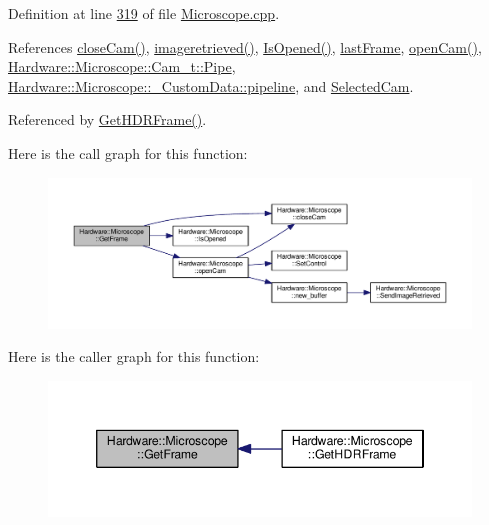 Definition at line \hyperlink{_microscope_8cpp_source_l00319}{319} of file \hyperlink{_microscope_8cpp_source}{Microscope.\+cpp}.



References \hyperlink{_microscope_8cpp_source_l00311}{close\+Cam()}, \hyperlink{class_hardware_1_1_microscope_a9ffc9b16e733b23c97d7dca4ef3210f5}{imageretrieved()}, \hyperlink{_microscope_8cpp_source_l00165}{Is\+Opened()}, \hyperlink{_microscope_8h_source_l00175}{last\+Frame}, \hyperlink{_microscope_8cpp_source_l00167}{open\+Cam()}, \hyperlink{_microscope_8h_source_l00130}{Hardware\+::\+Microscope\+::\+Cam\+\_\+t\+::\+Pipe}, \hyperlink{_microscope_8h_source_l00107}{Hardware\+::\+Microscope\+::\+\_\+\+Custom\+Data\+::pipeline}, and \hyperlink{_microscope_8h_source_l00149}{Selected\+Cam}.



Referenced by \hyperlink{_microscope_8cpp_source_l00333}{Get\+H\+D\+R\+Frame()}.



Here is the call graph for this function\+:
\nopagebreak
\begin{figure}[H]
\begin{center}
\leavevmode
\includegraphics[width=350pt]{class_hardware_1_1_microscope_a1ec5c792320ae4db3f3b39830e74f880_cgraph}
\end{center}
\end{figure}




Here is the caller graph for this function\+:
\nopagebreak
\begin{figure}[H]
\begin{center}
\leavevmode
\includegraphics[width=346pt]{class_hardware_1_1_microscope_a1ec5c792320ae4db3f3b39830e74f880_icgraph}
\end{center}
\end{figure}


